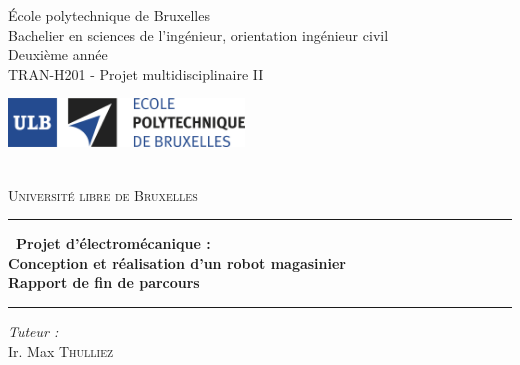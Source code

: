 \documentclass[a4paper,11pt]{article}
\newcommand{\hsp}{\hspace{20pt}}
\begin{document}
\begin{titlepage}
    \linespread{1}
    	\begin{center}
            \begin{framed}
              \parbox[c][13mm]{215pt}{
                \scriptsize\sf           École polytechnique de Bruxelles\\
                \scriptsize\sf           Bachelier en sciences de l'ingénieur, orientation ingénieur civil\\
                \scriptsize\sf           Deuxième année\\
                \scriptsize\sf           TRAN-H201 - Projet multidisciplinaire II
                }
                \hfill
              \parbox[c][13mm]{178.52396pt}{\includegraphics[height=13mm]{logo_EPB.jpg}}
            \end{framed}\\[1cm]
            
		
		\textsc{\Large Université libre de Bruxelles}\\[1.5cm]
		
		\hrule
		\begin{framed}{\Large\bfseries \ Projet d'électromécanique :\\ \LARGE Conception et réalisation d'un robot magasinier\\ \Large Rapport de fin de parcours}
		\end{framed}
		\hrule
		
		\vspace{12mm}
		
		\begin{minipage}[t]{0.6\textwidth}
			\begin{center} \large
			\emph{Tuteur :}            \\
			\vspace{2mm}
			Ir. Max \textsc{Thulliez}
			\end{center}
		\end{minipage}
		
		\hsp
		

\end{center}
\end{titlepage}
\end{document}
